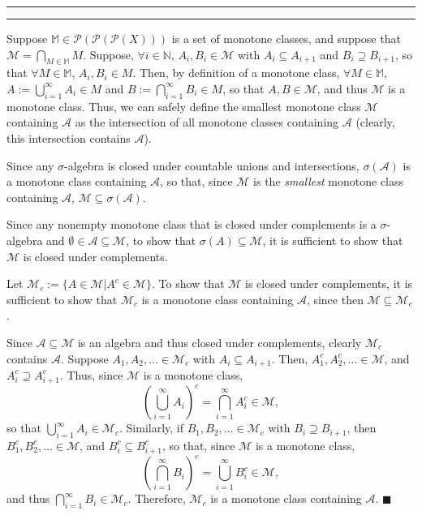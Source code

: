 \documentclass[11pt]{article}
\newcounter{questionCounter}
\newcounter{partCounter}[questionCounter]
\newenvironment{question}[2][\arabic{questionCounter}]{%
    \setcounter{partCounter}{0}%
    \vspace{.25in} \hrule \vspace{0.5em}%
        \noindent{\bf #2}%
    \vspace{0.8em} \hrule \vspace{.10in}%
    \addtocounter{questionCounter}{1}%
}{}
\renewcommand{\qed}{\quad $\blacksquare$}
\newcommand{\N}{\mathbb{N}} %
\newcommand{\pow}[1]{\mathcal{P}\left(#1\right)} %
\begin{document}
\begin{question}{Problem 6}
Suppose $\mathbb{M} \in \pow{\pow{\pow{X}}}$ is a set of monotone classes,
and suppose that $\mathcal{M} = \bigcap_{M \in \mathbb{M}} M$. Suppose,
$\forall i \in \N$, $A_i,B_i \in \mathcal{M}$ with $A_i \subseteq A_{i + 1}$
and $B_i \supseteq B_{i + 1}$, so that $\forall M \in \mathbb{M}$,
$A_i,B_i \in M$. Then, by definition of a monotone class,
$\forall M \in \mathbb{M}$, $A := \bigcup_{i = 1}^{\infty} A_i \in M$ and
$B := \bigcap_{i = 1}^{\infty} B_i \in M$, so that $A,B \in \mathcal{M}$, and
thus $\mathcal{M}$ is a monotone class. Thus, we can safely define the
smallest monotone class $\mathcal{M}$ containing $\mathcal{A}$ as the
intersection of all monotone classes containing $\mathcal{A}$ (clearly, this
intersection contains $\mathcal{A}$).

Since any $\sigma$-algebra is closed under countable unions and intersections,
$\sigma(\mathcal{A})$ is a monotone class containing $\mathcal{A}$, so that,
since $\mathcal{M}$ is the \emph{smallest} monotone class containing
$\mathcal{A}$, $\mathcal{M} \subseteq \sigma(\mathcal{A})$.

Since any nonempty monotone class that is closed under complements is a
$\sigma$-algebra and $\emptyset \in \mathcal{A} \subseteq \mathcal{M}$, to
show that $\sigma(A) \subseteq \mathcal{M}$, it is sufficient to show that
$\mathcal{M}$ is closed under complements.

Let $\mathcal{M}_c := \{A \in \mathcal{M} | A^c \in \mathcal{M}\}$. To
show that $\mathcal{M}$ is closed under complements, it is sufficient to show
that $\mathcal{M}_c$ is a monotone class containing $\mathcal{A}$, since then
$\mathcal{M} \subseteq \mathcal{M}_c$.

Since $\mathcal{A} \subseteq \mathcal{M}$ is an algebra and thus closed under
complements, clearly $\mathcal{M}_c$ contains $\mathcal{A}$.
Suppose
$A_1,A_2,\ldots \in \mathcal{M}_c$ with $A_i \subseteq A_{i + 1}$. Then,
$A_1^c,A_2^c,\ldots \in \mathcal{M}$, and $A_i^c \supseteq A_{i + 1}^c$.
Thus, since $\mathcal{M}$ is a monotone class,
\[\left( \bigcup_{i = 1}^{\infty} A_i \right)^c
 = \bigcap_{i = 1}^{\infty}A_i^c \in \mathcal{M},\]
so that $\bigcup_{i = 1}^{\infty} A_i \in \mathcal{M}_c$.
Similarly, if $B_1,B_2,\ldots \in \mathcal{M}_c$ with
$B_i \supseteq B_{i + 1}$, then
$B_1^c,B_2^c,\ldots \in \mathcal{M}$, and $B_i^c \subseteq B_{i + 1}^c$, so
that, since $\mathcal{M}$ is a monotone class,
\[\left( \bigcap_{i = 1}^{\infty} B_i \right)^c
 = \bigcup_{i = 1}^{\infty}B_i^c \in \mathcal{M},\]
and thus $\bigcap_{i = 1}^{\infty} B_i \in \mathcal{M}_c$.
Therefore, $\mathcal{M}_c$ is a monotone class containing $\mathcal{A}$. \qed
\end{question}
\end{document}
